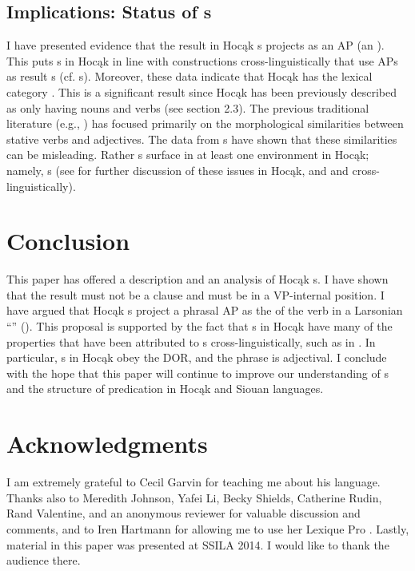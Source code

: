 \documentclass[output=paper]{LSP/langsci}
\begin{document}
\subsection{Implications: Status of s}

I have presented evidence that the result  in Hocąk s projects as an AP (an ). This puts s in Hocąk in line with  constructions cross-linguistically that use APs as result s (cf.  s). Moreover, these data indicate that Hocąk has the lexical category . This is a significant result since Hocąk has been previously described as only having nouns and verbs (see section 2.3). The previous traditional literature (e.g., \citealt{Helmbrecht2006b}) has focused primarily on the morphological similarities between stative verbs and adjectives. The data from s have shown that these similarities can be misleading. Rather s surface in at least one environment in Hocąk; namely, s (see \citealt{Rosen2014,Rosen2015} for further discussion of these issues in Hocąk, and \citealt{Baker2003} and \citealt{Dixon2004} cross-linguistically).

\section{Conclusion}\label{sec:rosen:6}
This paper has offered a description and an analysis of Hocąk s. I have shown that the result  must not be a clause and must be in a VP-internal position. I have argued that Hocąk s project a phrasal AP as the  of the verb in a Larsonian ``'' (\citealt{Larson1988}). This proposal is supported by the fact that s in Hocąk have many of the properties that have been attributed to s cross-linguistically, such as in . In particular, s in Hocąk obey the DOR, and the  phrase is adjectival. I conclude with the hope that this paper will continue to improve our understanding of s and the structure of predication in Hocąk and Siouan languages.

\section* {Acknowledgments}
I am extremely grateful to Cecil Garvin for teaching me about his language. Thanks also to Meredith Johnson, Yafei Li, Becky Shields, Catherine Rudin, Rand Valentine, and an anonymous reviewer for valuable discussion and comments, and to Iren Hartmann for allowing me to use her Lexique Pro . Lastly, material in this paper was presented at SSILA 2014. I would like to thank the audience there.
\end{document}
